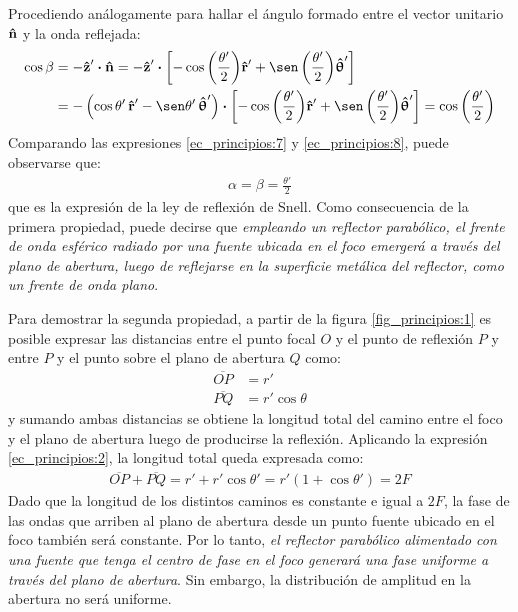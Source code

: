 Procediendo análogamente para hallar el ángulo formado entre el vector unitario $\bm{\mathbf{\hat{n}}}$ y la onda reflejada:
\begin{align}
\begin{split}
\cos\beta &= -\versor{z}'\prodesc\versor{n} = -\versor{z}'\prodesc\left[-\cos\left(\frac{\theta '}{2}\right)\!\versor{r}' + \sen\left(\frac{\theta '}{2}\right)\!\versor{\uptheta}'\right]\\
&= -\left(\cos\theta '\,\versor{r}' - \sen\theta '\,\versor{\uptheta}'\right)\prodesc\left[-\cos\left(\frac{\theta '}{2}\right)\!\versor{r}' + \sen\left(\frac{\theta '}{2}\right)\!\versor{\uptheta}'\right] = \cos\left(\frac{\theta '}{2}\right)
\end{split}
\label{ec_principios:8}
\end{align}
Comparando las expresiones \eqref{ec_principios:7} y \eqref{ec_principios:8}, puede observarse que:
\begin{align}
\alpha = \beta = \frac{\theta '}{2}
\label{ec_principios:9}
\end{align}
que es la expresión de la ley de reflexión de Snell. Como consecuencia de la primera propiedad, puede decirse que \emph{empleando un reflector parabólico, el frente de onda esférico radiado por una fuente ubicada en el foco emergerá a través del plano de abertura, luego de reflejarse en la superficie metálica del reflector, como un frente de onda plano}.

Para demostrar la segunda propiedad, a partir de la figura \ref{fig_principios:1} es posible expresar las distancias entre el punto focal $O$ y el punto de reflexión $P$ y entre $P$ y el punto sobre el plano de abertura $Q$ como:
\begin{subequations}
\label{grup_ec_principios:1}
\begin{align}
\overline{OP} &= r'
\label{ec_principios:10}\\
\overline{PQ} &= r'\cos\theta
\label{ec_principios:11}
\end{align}
\end{subequations}
y sumando ambas distancias se obtiene la longitud total del camino entre el foco y el plano de abertura luego de producirse la reflexión. Aplicando la expresión \eqref{ec_principios:2}, la longitud total queda expresada como:
\begin{align}
\overline{OP} + \overline{PQ} = r' + r'\cos\theta ' = r'\left(1 + \cos\theta '\right) = 2F
\label{ec_principios:12}
\end{align}
Dado que la longitud de los distintos caminos es constante e igual a $2F$, la fase de las ondas que arriben al plano de abertura desde un punto fuente ubicado en el foco también será constante. Por lo tanto, \emph{el reflector parabólico alimentado con una fuente que tenga el centro de fase en el foco generará una fase uniforme a través del plano de abertura}. Sin embargo, la distribución de amplitud en la abertura no será uniforme.

